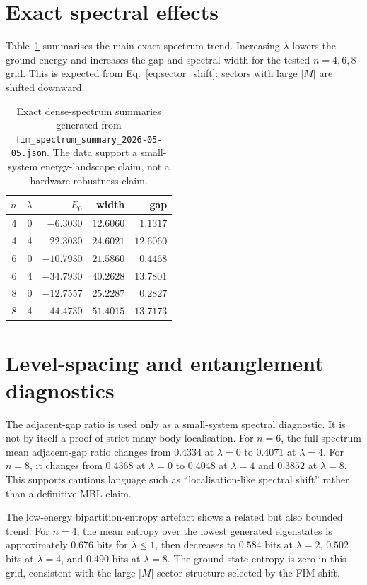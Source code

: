 \documentclass[preprint,aps,physrev,superscriptaddress,floatfix,longbibliography]{revtex4-2}
\begin{document}
\section{Exact spectral effects}

Table~\ref{tab:spectrum} summarises the main exact-spectrum trend. Increasing
$\lambda$ lowers the ground energy and increases the gap and spectral width
for the tested $n=4,6,8$ grid. This is expected from
Eq.~\eqref{eq:sector_shift}: sectors with large $|M|$ are shifted downward.

\begin{table}[tb]
\centering
\small
\begin{tabular}{rrrrr}
\toprule
$n$ & $\lambda$ & $E_0$ & width & gap \\
\midrule
4 & 0 & $-6.3030$ & $12.6060$ & $1.1317$ \\
4 & 4 & $-22.3030$ & $24.6021$ & $12.6060$ \\
6 & 0 & $-10.7930$ & $21.5860$ & $0.4468$ \\
6 & 4 & $-34.7930$ & $40.2628$ & $13.7801$ \\
8 & 0 & $-12.7557$ & $25.2287$ & $0.2827$ \\
8 & 4 & $-44.4730$ & $51.4015$ & $13.7173$ \\
\bottomrule
\end{tabular}
\caption{Exact dense-spectrum summaries generated from
\texttt{fim\_spectrum\_summary\_2026-05-05.json}. The data support a
small-system energy-landscape claim, not a hardware robustness claim.}
\label{tab:spectrum}
\end{table}

\section{Level-spacing and entanglement diagnostics}

The adjacent-gap ratio is used only as a small-system spectral diagnostic. It is
not by itself a proof of strict many-body localisation. For $n=6$, the
full-spectrum mean adjacent-gap ratio changes from $0.4334$ at $\lambda=0$ to
$0.4071$ at $\lambda=4$. For $n=8$, it changes from $0.4368$ at $\lambda=0$ to
$0.4048$ at $\lambda=4$ and $0.3852$ at $\lambda=8$. This supports cautious
language such as ``localisation-like spectral shift'' rather than a definitive
MBL claim.

The low-energy bipartition-entropy artefact shows a related but also bounded
trend. For $n=4$, the mean entropy over the lowest generated eigenstates is
approximately $0.676$ bits for $\lambda\leq 1$, then decreases to
$0.584$ bits at $\lambda=2$, $0.502$ bits at $\lambda=4$, and
$0.490$ bits at $\lambda=8$. The ground state entropy is zero in this grid,
consistent with the large-$|M|$ sector structure selected by the FIM shift.
\end{document}

